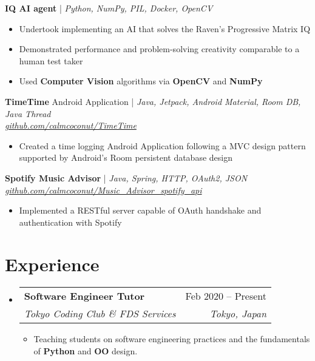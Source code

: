\documentclass[12pt, a4paper]{article}
\makeatletter
\newcommand{\resumeItem}[1]{
  \item\small{
    {#1 \vspace{-2pt}}
  }
}
\newcommand{\resumeSubheading}[4]{
  \vspace{-2pt}\item
    \begin{tabular*}{0.97\textwidth}[t]{l@{\extracolsep{\fill}}r}
      \textbf{#1} & #2 \\
      \textit{\small#3} & \textit{\small #4} \\
    \end{tabular*}\vspace{-7pt}
}
\newcommand{\resumeSubHeadingListStart}{\begin{itemize}[leftmargin=0.15in, label={}]}
\newcommand{\resumeSubHeadingListEnd}{\end{itemize}}
\newcommand{\resumeItemListStart}{\begin{itemize}[noitemsep]} %
\newcommand{\resumeItemListEnd}{\end{itemize}\vspace{-16pt}}
\makeatother
\begin{document}
\textbf{IQ AI agent} | \small\textit{Python, NumPy, PIL, Docker, OpenCV}
\begin{itemize}[noitemsep,topsep=0pt]
  \item Undertook implementing an AI that solves the Raven's Progressive Matrix IQ
  \item Demonstrated performance and problem-solving creativity comparable to a human test taker
  \item Used \textbf{Computer Vision} algorithms via \textbf{OpenCV} and \textbf{NumPy}
\end{itemize}

\textbf{TimeTime} Android Application | \small\textit{Java, Jetpack, Android Material, Room DB, Java Thread}
\\ \href{https://github.com/calmcoconut/TimeTime}{\textit{github.com/calmcoconut/TimeTime}}
\begin{itemize}[noitemsep,topsep=0pt]
  \item Created a time logging Android Application following a MVC design pattern supported by Android's Room persistent database design
\end{itemize}

\textbf{Spotify Music Advisor} | \small\textit{Java, Spring, HTTP, OAuth2, JSON}
\\ \href{https://github.com/calmcoconut/Music_Advisor_spotify_api}{\textit{github.com/calmcoconut/Music\_Advisor\_spotify\_api}}
\begin{itemize}[noitemsep,topsep=0pt]
  \item Implemented a RESTful server capable of OAuth handshake and authentication with Spotify
\end{itemize}


\section{Experience}

\resumeSubHeadingListStart
  \resumeSubheading
    {Software Engineer Tutor}{Feb 2020 -- Present}
    {Tokyo Coding Club \& FDS Services}{Tokyo, Japan}
    \resumeItemListStart
      \resumeItem{Teaching students on software engineering practices and the fundamentals of \textbf{Python} and \textbf{OO} design.}
    \resumeItemListEnd
    \resumeSubHeadingListEnd
\end{document}
